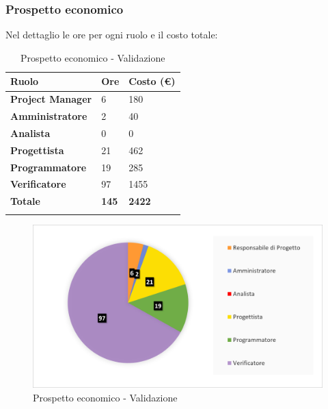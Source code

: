 \subsubsection{Prospetto economico}
Nel dettaglio le ore per ogni ruolo e il costo totale: 
\begin{center}
	\def\arraystretch{1.6}
	\bgroup
	\begin{longtable}{| p{4cm} | p{1cm} | p{2cm} |}
		\hline
		\textbf{Ruolo} & \textbf{Ore} & \textbf{Costo (€)} \\ 
		
		\hline \hline  
		
		\textbf{Project Manager} & {6} & {180} \\ 
		\hline 
		
		\textbf{Amministratore} & {2} & {40} \\ 
		\hline 
		
		\textbf{Analista} & {0} & {0} \\ 
		\hline 
		
		\textbf{Progettista} & {21} & {462} \\ 
		\hline 
		
		\textbf{Programmatore} & {19} & {285} \\ 
		\hline 
		
		\textbf{Verificatore} & {97} & {1455} \\ 
		\hline 
		
		\textbf{Totale} & \textbf{145} & \textbf{2422} \\ 
		\hline 
		
		
		\hline 
		
		\caption{Prospetto economico - Validazione}
	\end{longtable}
	\egroup
\end{center}
\begin{figure}[H]
	\centering
	\includegraphics[width= 14cm]{immagini/va_torta.png}
	\caption{Prospetto economico - Validazione}
\end{figure}
\newpage

